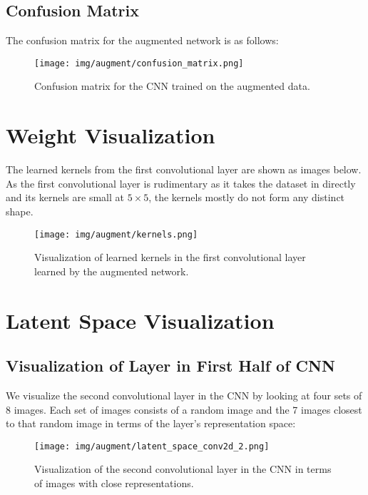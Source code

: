 \documentclass{article}
\begin{document}
\subsection{Confusion Matrix}
The confusion matrix for the augmented network is as follows:

\begin{figure}[ht]
\centering
\texttt{[image: img/augment/confusion\_matrix.png]}
\caption{Confusion matrix for the CNN trained on the augmented data.}
\end{figure}



 

\section{Weight Visualization}
The learned kernels from the first convolutional layer are shown as images below. As the first convolutional layer is rudimentary as it takes the dataset in directly and its kernels are small at $5 \times 5$, the kernels mostly do not form any distinct shape.

\begin{figure}[ht]
\centering
\texttt{[image: img/augment/kernels.png]}
\caption{Visualization of learned kernels in the first convolutional layer learned by the augmented network.}
\end{figure}




\section{Latent Space Visualization}

\subsection{Visualization of Layer in First Half of CNN}
We visualize the second convolutional layer in the CNN by looking at four sets of 8 images. Each set of images consists of a random image and the 7 images closest to that random image in terms of the layer's representation space:

\begin{figure}[ht]
\centering
\texttt{[image: img/augment/latent\_space\_conv2d\_2.png]}
\caption{Visualization of the second convolutional layer in the CNN in terms of images with close representations.}
\end{figure}
\end{document}

